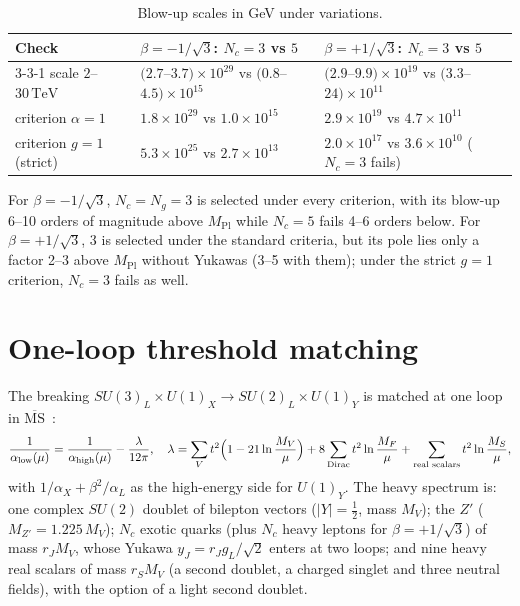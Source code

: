 \documentclass[11pt,a4paper]{article}
\newcommand{\Nc}{N_c}
\newcommand{\Ng}{N_g}
\newcommand{\MPl}{M_{\mathrm{Pl}}}
\newcommand{\TeV}{\,\mathrm{TeV}}
\begin{document}
\begin{table}[h]\centering\small
\begin{tabular}{lll}
\toprule
Check & $\beta=-1/\sqrt3$: $\Nc=3$ vs $5$ & $\beta=+1/\sqrt3$: $\Nc=3$ vs $5$\\
\midrule
3-3-1 scale $2$--$30\TeV$ & $(2.7$--$3.7)\times10^{29}$ vs $(0.8$--$4.5)\times10^{15}$ & $(2.9$--$9.9)\times10^{19}$ vs $(3.3$--$24)\times10^{11}$\\
criterion $\alpha=1$ & $1.8\times10^{29}$ vs $1.0\times10^{15}$ & $2.9\times10^{19}$ vs $4.7\times10^{11}$\\
criterion $g=1$ (strict) & $5.3\times10^{25}$ vs $2.7\times10^{13}$ & $2.0\times10^{17}$ vs $3.6\times10^{10}$ ($\Nc=3$ fails)\\
\bottomrule
\end{tabular}
\caption{Blow-up scales in GeV under variations.}\label{tab:robust}
\end{table}

For $\beta=-1/\sqrt3$, $\Nc=\Ng=3$ is selected under every criterion, with its blow-up
6--10 orders of magnitude above $\MPl$ while $\Nc=5$ fails 4--6 orders below. For
$\beta=+1/\sqrt3$, 3 is selected under the standard criteria, but its pole lies only a
factor 2--3 above $\MPl$ without Yukawas (3--5 with them); under the strict $g=1$
criterion, $\Nc=3$ fails as well.

\section{One-loop threshold matching}\label{sec:threshold}

The breaking $SU(3)_L\times U(1)_X\to SU(2)_L\times U(1)_Y$ is matched at one loop in
$\overline{\text{MS}}$~\cite{Weinberg:1980wa,Hall:1980kf}:
\begin{equation}
\frac{1}{\alpha_{\text{low}}(\mu)}=\frac{1}{\alpha_{\text{high}}(\mu)}-\frac{\lambda}{12\pi},\quad
\lambda=\sum_V t^2\Bigl(1-21\ln\frac{M_V}{\mu}\Bigr)+8\sum_{\text{Dirac}}t^2\ln\frac{M_F}{\mu}
+\sum_{\text{real scalars}}t^2\ln\frac{M_S}{\mu},
\end{equation}
with $1/\alpha_X+\beta^2/\alpha_L$ as the high-energy side for $U(1)_Y$. The heavy
spectrum is: one complex $SU(2)$ doublet of bilepton vectors ($|Y|=\tfrac12$, mass
$M_V$); the $Z'$ ($M_{Z'}=1.225\,M_V$); $\Nc$ exotic quarks (plus $\Nc$ heavy leptons for
$\beta=+1/\sqrt3$) of mass $r_JM_V$, whose Yukawa $y_J=r_Jg_L/\sqrt2$ enters at two loops;
and nine heavy real scalars of mass $r_SM_V$ (a second doublet, a charged singlet and three
neutral fields), with the option of a light second doublet.
\end{document}

